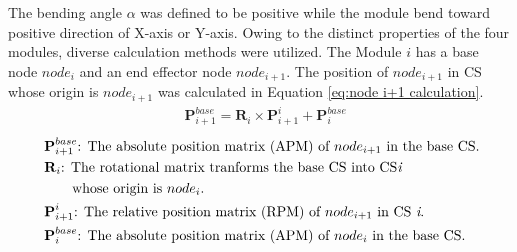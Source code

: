 \noindent The bending angle $\alpha$ was defined to be positive while the module bend toward positive 
direction of X-axis or Y-axis. Owing to the distinct properties of the four modules, diverse calculation 
methods were utilized. The Module $i$ has a base node $node_i$ and an end effector node $node_{i+1}$. 
The position of $node_{i+1}$ in CS whose origin is $node_{i+1}$ was calculated in Equation 
\ref{eq:node i+1 calculation}.
\begin{align}
    &\textbf{P}_{i+1}^{base} = \textbf{R}_{i} \times \textbf{P}_{i+1}^{i} + \textbf{P}_{i}^{base}
    \label{eq:node i+1 calculation}
\end{align}
\begin{align*}
    &\ \textbf{P}_{i+1}^{base}\text{: The absolute position matrix (APM) of $node_{i+1}$ in the base CS.}\\
    &\ \textbf{R}_{i}\text{: The rotational matrix tranforms the base CS into CS\textit{i} }\\
    &\ \qquad\text{whose origin is $node_i$.}\\
    &\ \textbf{P}_{i+1}^{i}\text{: The relative position matrix (RPM) of $node_{i+1}$ in CS \textit{i}.}\\
    &\ \textbf{P}_{i}^{base}\text{: The absolute position matrix (APM) of $node_{i}$ in the base CS.}
\end{align*}
